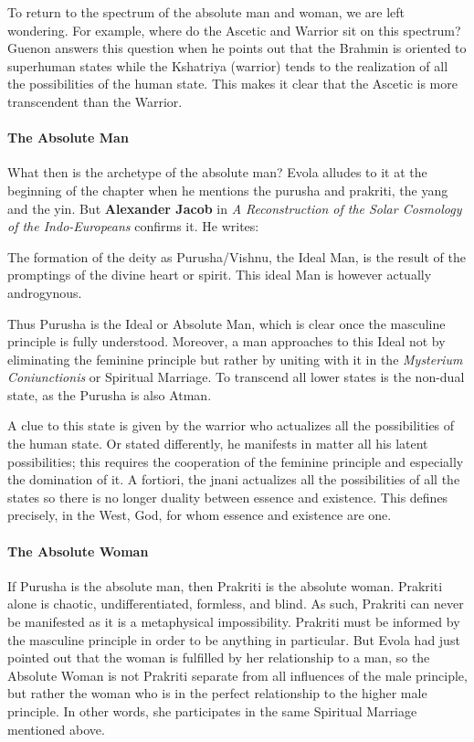 To return to the spectrum of the absolute man and woman, we are left wondering. For example, where do the Ascetic and Warrior sit on this spectrum? Guenon answers this question when he points out that the Brahmin is oriented to superhuman states while the Kshatriya (warrior) tends to the realization of all the possibilities of the human state. This makes it clear that the Ascetic is more transcendent than the Warrior.

\paragraph{The Absolute Man}
What then is the archetype of the absolute man? Evola alludes to it at the beginning of the chapter when he mentions the purusha and prakriti, the yang and the yin. But \textbf{Alexander Jacob} in \emph{A Reconstruction of the Solar Cosmology of the Indo-Europeans} confirms it. He writes:

\begin{quotex}
The formation of the deity as Purusha/Vishnu, the Ideal Man, is the result of the promptings of the divine heart or spirit. This ideal Man is however actually androgynous. 

\end{quotex}
Thus Purusha is the Ideal or Absolute Man, which is clear once the masculine principle is fully understood. Moreover, a man approaches to this Ideal not by eliminating the feminine principle but rather by uniting with it in the \emph{Mysterium Coniunctionis} or Spiritual Marriage. To transcend all lower states is the non-dual state, as the Purusha is also Atman.

A clue to this state is given by the warrior who actualizes all the possibilities of the human state. Or stated differently, he manifests in matter all his latent possibilities; this requires the cooperation of the feminine principle and especially the domination of it. A fortiori, the jnani actualizes all the possibilities of all the states so there is no longer duality between essence and existence. This defines precisely, in the West, God, for whom essence and existence are one.

\paragraph{The Absolute Woman}
If Purusha is the absolute man, then Prakriti is the absolute woman. Prakriti alone is chaotic, undifferentiated, formless, and blind. As such, Prakriti can never be manifested as it is a metaphysical impossibility. Prakriti must be informed by the masculine principle in order to be anything in particular. But Evola had just pointed out that the woman is fulfilled by her relationship to a man, so the Absolute Woman is not Prakriti separate from all influences of the male principle, but rather the woman who is in the perfect relationship to the higher male principle. In other words, she participates in the same Spiritual Marriage mentioned above.

